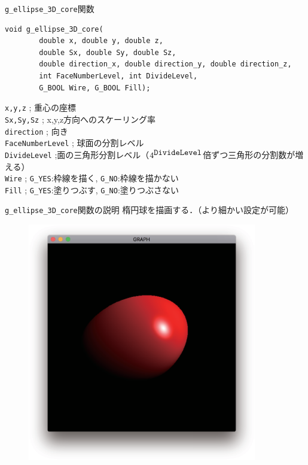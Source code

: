 \documentclass[platex,a4paper,12pt]{jsarticle}%
\begin{document}
\begin{itembox}[l]{\texttt{g\_ellipse\_3D\_core}関数}
\begin{verbatim}
void g_ellipse_3D_core(
        double x, double y, double z,
        double Sx, double Sy, double Sz,
        double direction_x, double direction_y, double direction_z,
        int FaceNumberLevel, int DivideLevel, 
        G_BOOL Wire, G_BOOL Fill);   
\end{verbatim}
\verb|x,y,z| ; 重心の座標\\
\verb|Sx,Sy,Sz| ; x,y,z方向へのスケーリング率\\
\verb|direction| ; 向き\\
\verb|FaceNumberLevel| ; 球面の分割レベル\\
\verb|DivideLevel| ;面の三角形分割レベル（$4^{\verb|DivideLevel|}$倍ずつ三角形の分割数が増える）\\
\verb|Wire| ; \verb|G_YES|:枠線を描く, \verb|G_NO|:枠線を描かない \\
\verb|Fill| ; \verb|G_YES|:塗りつぶす, \verb|G_NO|:塗りつぶさない
\end{itembox}

\begin{itembox}[l]{\texttt{g\_ellipse\_3D\_core}関数の説明}
楕円球を描画する．（より細かい設定が可能）
\end{itembox}

\begin{figure}[htb]
\centering
\includegraphics[width=100mm]{Canvas_g_ellipse_SDL.eps}
\end{figure}
\end{document}
